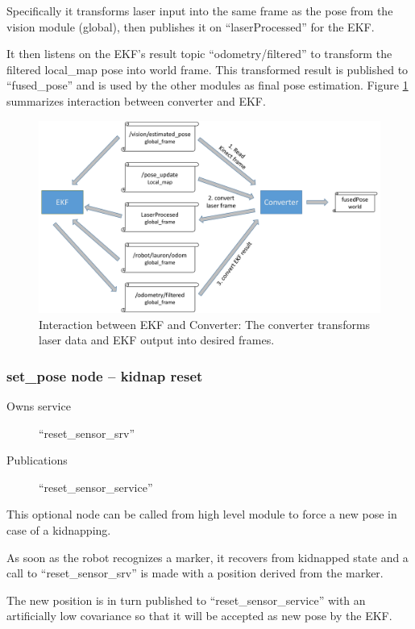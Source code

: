 Specifically it transforms laser input into the same frame as the pose from the vision module (global), then publishes it on ``laserProcessed'' for the EKF.

It then listens on the EKF's result topic ``odometry/filtered'' to transform the filtered local\_map pose into world frame. This transformed result is published to ``fused\_pose'' and is used by the other modules as final pose estimation. Figure \ref{ekf - converter} summarizes interaction between converter and EKF.

\begin{figure}[ht]
\centering
\includegraphics[width=\textwidth]{graphics/ekf_converter.pdf}
\caption[EKF -- Converter interaction]{Interaction between EKF and Converter: The converter transforms laser data and EKF output into desired frames.}
\centering
\label{ekf - converter}
\end{figure}


\subsubsection{set\_pose node -- kidnap reset}
\begin{description}
\item[Owns service] ``reset\_sensor\_srv''
\item[Publications] ``reset\_sensor\_service''
\end{description}

This optional node can be called from high level module to force a new pose in case of a kidnapping.

As soon as the robot recognizes a marker, it recovers from kidnapped state and a call to ``reset\_sensor\_srv'' is made with a position derived from the marker.

The new position is in turn published to ``reset\_sensor\_service'' with an artificially low covariance so that it will be accepted as new pose by the EKF.


